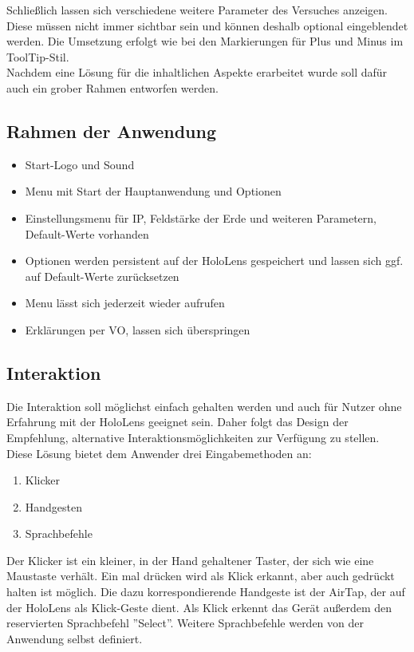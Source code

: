 Schließlich lassen sich verschiedene weitere Parameter des Versuches anzeigen. Diese müssen nicht immer sichtbar sein und können deshalb optional eingeblendet werden. Die Umsetzung erfolgt wie bei den Markierungen für Plus und Minus im ToolTip-Stil.\\

Nachdem eine Lösung für die inhaltlichen Aspekte erarbeitet wurde soll dafür auch ein grober Rahmen entworfen werden.

\subsection{Rahmen der Anwendung}

\begin{itemize}[topsep=-2px]
	\setlength{\itemsep}{-5pt}
	\item Start-Logo und Sound
	\item Menu mit Start der Hauptanwendung und Optionen
	\item Einstellungsmenu für IP, Feldstärke der Erde und weiteren Parametern, Default-Werte vorhanden
	\item Optionen werden persistent auf der HoloLens gespeichert und lassen sich ggf. auf Default-Werte zurücksetzen
	\item Menu lässt sich jederzeit wieder aufrufen
	\item Erklärungen per VO, lassen sich überspringen
\end{itemize}

\subsection{Interaktion}
Die Interaktion soll möglichst einfach gehalten werden und auch für Nutzer ohne Erfahrung mit der HoloLens geeignet sein. Daher folgt das Design der Empfehlung, alternative Interaktionsmöglichkeiten zur Verfügung zu stellen. Diese Lösung bietet dem Anwender drei Eingabemethoden an:
\begin{enumerate}
	\setlength{\itemsep}{-5pt}
	\item Klicker
	\item Handgesten
	\item Sprachbefehle
\end{enumerate}

Der Klicker ist ein kleiner, in der Hand gehaltener Taster, der sich wie eine Maustaste verhält. Ein mal drücken wird als Klick erkannt, aber auch gedrückt halten ist möglich.
Die dazu korrespondierende Handgeste ist der AirTap, der auf der HoloLens als Klick-Geste dient. Als Klick erkennt das Gerät außerdem den reservierten Sprachbefehl ''Select''. Weitere Sprachbefehle werden von der Anwendung selbst definiert.\\

